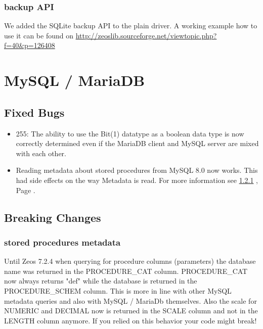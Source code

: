 \documentclass[a4paper,12pt,oneside]{book}
\begin{document}
\subsubsection{backup API}
\label{sec:Rev6_SQLite_Changes_BackupApi}

We added the SQLite backup API to the plain driver.
A working example how to use it can be found on \url{http://zeoslib.sourceforge.net/viewtopic.php?f=40&p=126408}

\section{MySQL / MariaDB}
\label{sec:Rev6_MysqlMariadb}

\subsection{Fixed Bugs}
\label{sec:Rev6_MysqlMariadb_FixedBugs}

\begin{itemize}
\item 255:
  The ability to use the Bit(1) datatype as a boolean data type is now correctly determined even if the MariaDB client and MySQL server are mixed with each other.
\item 
  Reading metadata about stored procedures from MySQL 8.0 now works. This had side effects on the way Metadata is read.
	For more information see \ref{sec:Rev6_MysqlMariadb_BreakingChanges_StoredProcMetadata} , Page \pageref{sec:Rev6_MysqlMariadb_BreakingChanges_StoredProcMetadata}.
\end{itemize}

\subsection{Breaking Changes}
\label{sec:Rev6_MysqlMariadb_BreakingChanges}

\subsubsection{stored procedures metadata}
\label{sec:Rev6_MysqlMariadb_BreakingChanges_StoredProcMetadata}

Until Zeos 7.2.4 when querying for procedure columns (parameters) the database name was returned in the PROCEDURE\_CAT column.
PROCEDURE\_CAT now always returns "def" while the database is returned in the PROCEDURE\_SCHEM column.
This is more in line with other MySQL metadata queries and also with MySQL / MariaDb themselves.
Also the scale for NUMERIC and DECIMAL now is returned in the SCALE column and not in the LENGTH column anymore.
If you relied on this behavior your code might break!
\end{document}
